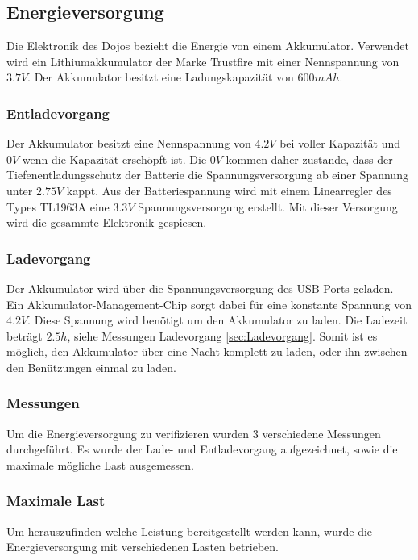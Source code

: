 \newpage
\subsection{Energieversorgung} \label{sec:Energie}
Die Elektronik des Dojos bezieht die Energie von einem Akkumulator. Verwendet wird ein Lithiumakkumulator der Marke Trustfire mit einer Nennspannung von $3.7V$. Der Akkumulator besitzt eine Ladungskapazität von $600mAh$.

\subsubsection{Entladevorgang} 
Der Akkumulator besitzt eine Nennspannung von $4.2V$ bei voller Kapazität und $0V$ wenn die Kapazität erschöpft ist. Die $0V$ kommen daher zustande, dass der Tiefenentladungsschutz der Batterie die Spannungsversorgung ab einer Spannung unter $2.75V$ kappt. Aus der Batteriespannung wird mit einem Linearregler des Types TL1963A eine $3.3V$ Spannungsversorgung erstellt. Mit dieser Versorgung wird die gesammte Elektronik gespiesen.

\subsubsection{Ladevorgang}
Der Akkumulator wird über die Spannungsversorgung des USB-Ports geladen. Ein Akkumulator-Management-Chip sorgt dabei für eine konstante Spannung von $4.2V$. Diese Spannung wird benötigt um den Akkumulator zu laden. Die Ladezeit beträgt $2.5h$, siehe Messungen Ladevorgang \ref{sec:Ladevorgang}. Somit ist es möglich, den Akkumulator über eine Nacht komplett zu laden, oder ihn zwischen den Benützungen einmal zu laden. 

\subsubsection{Messungen}
Um die Energieversorgung zu verifizieren wurden 3 verschiedene Messungen durchgeführt. Es wurde der Lade- und Entladevorgang aufgezeichnet, sowie die maximale mögliche Last ausgemessen.

\subsubsection*{Maximale Last}
Um herauszufinden welche Leistung bereitgestellt werden kann, wurde die Energieversorgung mit verschiedenen Lasten betrieben. 

